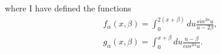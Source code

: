 \documentclass[12pt]{article}
\begin{document}
where I have defined the functions
\begin{subequations}
\begin{align}
&f_{\alpha}(x,\beta)=\int_0^{2(x+\beta)}du\frac{sin^{2\alpha}u}{u-2\beta},\label{eq:falpha}\\\
&g_{\alpha}(x,\beta)=\int_0^{x+\beta}du\frac{u-\beta}{cos^{2\alpha}u}.\label{eq:galpha}
\end{align}
\end{subequations}
\clearpage


\end{document}
